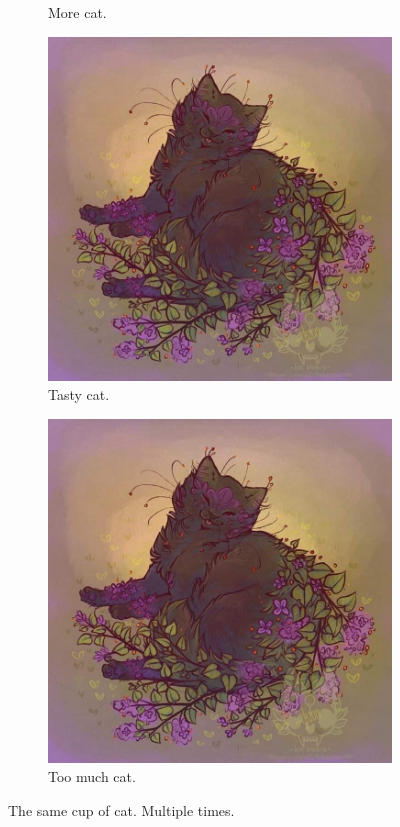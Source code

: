 \documentclass{article}
\begin{document}
\begin{figure}[H]
\begin{subfigure}[b]{0.2\linewidth}
    \caption{More cat.}
  \end{subfigure}
  \begin{subfigure}[b]{0.2\linewidth}
    \includegraphics[width=\linewidth]{cat.jpg}
    \caption{Tasty cat.}
  \end{subfigure}
  \begin{subfigure}[b]{0.5\linewidth}
    \includegraphics[width=\linewidth]{cat.jpg}
    \caption{Too much cat.}
  \end{subfigure}
  \caption{The same cup of cat. Multiple times.}
  \label{fig:cat3}
\end{figure}

\begin{appendix}
  \listoffigures
  \listoftables
\end{appendix}
\end{document}
